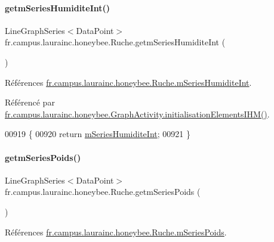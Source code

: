 \paragraph{\texorpdfstring{getm\+Series\+Humidite\+Int()}{getmSeriesHumiditeInt()}}
{\footnotesize\ttfamily Line\+Graph\+Series$<$Data\+Point$>$ fr.\+campus.\+laurainc.\+honeybee.\+Ruche.\+getm\+Series\+Humidite\+Int (\begin{DoxyParamCaption}{ }\end{DoxyParamCaption})}



Références \hyperlink{classfr_1_1campus_1_1laurainc_1_1honeybee_1_1_ruche_af36001cde96599deef784d3be498ae65}{fr.\+campus.\+laurainc.\+honeybee.\+Ruche.\+m\+Series\+Humidite\+Int}.



Référencé par \hyperlink{classfr_1_1campus_1_1laurainc_1_1honeybee_1_1_graph_activity_a7000895983725c6f795f7c73c1fafd20}{fr.\+campus.\+laurainc.\+honeybee.\+Graph\+Activity.\+initialisation\+Elements\+I\+H\+M()}.


\begin{DoxyCode}
00919                                                               \{
00920         \textcolor{keywordflow}{return} \hyperlink{classfr_1_1campus_1_1laurainc_1_1honeybee_1_1_ruche_af36001cde96599deef784d3be498ae65}{mSeriesHumiditeInt};
00921     \}
\end{DoxyCode}
\mbox{\label{classfr_1_1campus_1_1laurainc_1_1honeybee_1_1_ruche_aebd7c24cbb596731671db1a9554c8351}} 
\paragraph{\texorpdfstring{getm\+Series\+Poids()}{getmSeriesPoids()}}
{\footnotesize\ttfamily Line\+Graph\+Series$<$Data\+Point$>$ fr.\+campus.\+laurainc.\+honeybee.\+Ruche.\+getm\+Series\+Poids (\begin{DoxyParamCaption}{ }\end{DoxyParamCaption})}



Références \hyperlink{classfr_1_1campus_1_1laurainc_1_1honeybee_1_1_ruche_ac181c5f8d7cc950c4f015d8abccf44d8}{fr.\+campus.\+laurainc.\+honeybee.\+Ruche.\+m\+Series\+Poids}.



